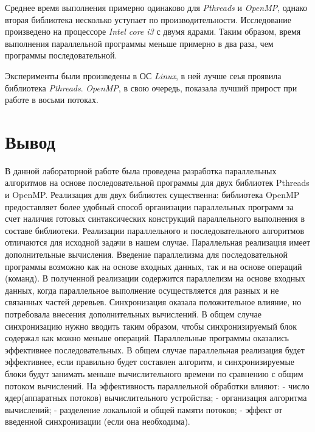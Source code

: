 \documentclass[10pt,a4paper]{report}
\begin{document}
	Среднее время выполнения примерно одинаково для \textit{Pthreads} и \textit{OpenMP}, однако вторая библиотека несколько уступает по производительности. Исследование произведено на процессоре \textit{Intel core i3} с двумя ядрами. Таким образом, время выполнения параллельной программы меньше примерно в два раза, чем программы последовательной.
	
	Эксперименты были произведены в ОС  \textit{Linux}, в ней лучше сеья проявила библиотека \textit{Pthreads}. \textit{OpenMP}, в свою очередь, показала лучший прирост при работе в восьми потоках. 
	
	\chapter{Вывод}
	В данной лабораторной работе была проведена разработка параллельных
	алгоритмов на основе последовательной программы для двух библиотек
	Pthreads и OpenMP. Реализация для двух библиотек существенна:
	библиотека OpenMP предоставляет более удобный способ организации
	параллельных программ за счет наличия готовых синтаксических
	конструкций параллельного выполнения в составе библиотеки.
	Реализации параллельного и последовательного алгоритмов отличаются для
	исходной задачи в нашем случае. Параллельная реализация имеет
	дополнительные вычисления.
	Введение параллелизма для последовательной программы возможно как на
	основе входных данных, так и на основе операций (команд). В полученной
	реализации содержится параллелизм на основе входных данных, когда
	параллельное выполнение осуществляется для разных и не связанных частей
	деревьев.
	Синхронизация оказала положительное влияние, но потребовала внесения
	дополнительных вычислений. В общем случае синхронизацию нужно
	вводить таким образом, чтобы синхронизируемый блок содержал как можно
	меньше операций.
	Параллельные программы оказались эффективнее последовательных. В
	общем случае параллельная реализация будет эффективнее, если правильно
	будет составлен алгоритм, и синхронизируемые блоки будут занимать
	меньше вычислительного времени по сравнению с общим потоком
	вычислений. На эффективность параллельной обработки влияют:
	- число ядер(аппаратных потоков) вычислительного устройства;
	- организация алгоритма вычислений;
	- разделение локальной и общей памяти потоков;
	- эффект от введенной синхронизации (если она необходима).
	
\end{document}
